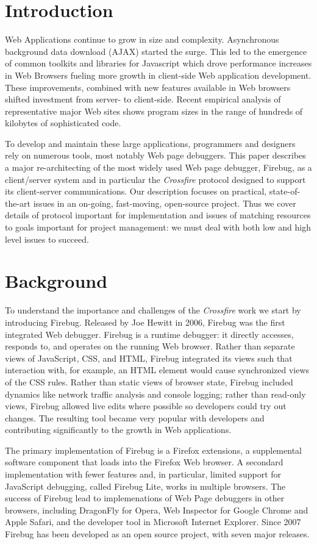 
\section{Introduction}
Web Applications continue to grow in size and complexity. Asynchronous
background data download (AJAX) started the surge. This led to the emergence of
common toolkits and libraries for Javascript which drove  performance increases
in Web Browsers fueling more growth in client-side Web application development.
These improvements, combined with new features available in Web browsers shifted
investment from server- to client-side. Recent empirical analysis of
representative
 major Web sites shows program sizes in the range of hundreds of kilobytes of
sophisticated code.\cite{VitekDynamicJS2010}

To develop and maintain these large applications, programmers and designers rely
on numerous tools, most notably Web page debuggers. This paper describes a major
re-architecting of the most widely used Web page debugger, Firebug, as a
client/server system and in particular the \textit{Crossfire} protocol designed
to support its client-server communications. Our description focuses on
practical, state-of-the-art issues in an on-going, fast-moving, open-source project. Thus
we cover details of protocol important for implementation and issues of matching
resources to goals important for project management: we must deal with both
low and high level issues to succeed.

\section{Background}
To understand the importance and challenges of the \textit{Crossfire} work we
start by introducing Firebug. Released by Joe Hewitt in 2006, Firebug was the
first integrated Web debugger. Firebug is a runtime debugger: it directly
accesses, responds to, and operates on the running Web browser.  Rather than
separate views of JavaScript, CSS, and HTML, Firebug integrated its views such
that interaction with, for example, an HTML element would cause synchronized
views of the CSS rules. Rather than static
 views of browser state, Firebug included dynamics like network traffic analysis
 and console logging; rather
than read-only views, Firebug allowed live edits where possible so developers
could try out changes. The resulting tool became very popular with developers
and contributing significantly to the growth in Web applications.

The primary implementation of Firebug is a Firefox extensions, a supplemental
software component that loads into the Firefox Web browser. A secondard
implementation with fewer features and, in particular, limited support for
JavaScript debugging, called Firebug Lite, works in multiple browsers. The
success of Firebug lead to implemenations of Web Page debuggers in other
browsers, including DragonFly for Opera, Web Inspector for Google Chrome and
Apple Safari, and the developer tool in Microsoft Internet Explorer. Since 2007
Firebug has been developed as an open source project, with seven major releases.

